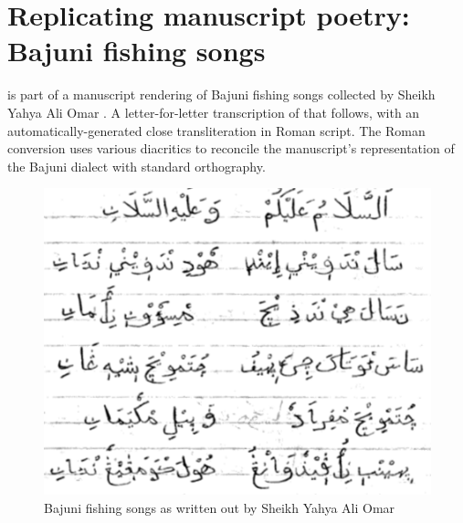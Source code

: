 \begin{quotation}
\end{quotation}

\section{Replicating manuscript poetry: Bajuni fishing songs}
 is part of a manuscript rendering of Bajuni fishing songs collected by Sheikh Yahya Ali Omar \citep{Donnelly1982}.  A letter-for-letter transcription of that follows, with an automatically-generated close transliteration in Roman script.  The Roman conversion uses various diacritics to reconcile the manuscript's representation of the Bajuni dialect with standard orthography.

\begin{figure}[ht]
\centering
\includegraphics[keepaspectratio=true]{./images/fishing_orig.png}
\caption{Bajuni fishing songs as written out by Sheikh Yahya Ali Omar}
\label{fig:fishing}
\end{figure}

